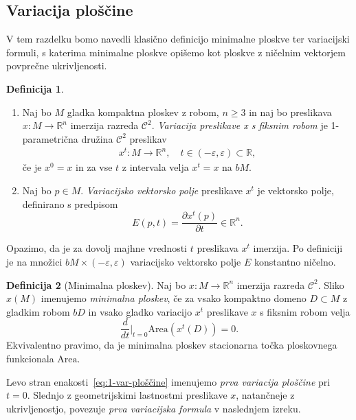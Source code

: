 \documentclass[12pt,a4paper,twoside]{article}
\theoremstyle{definition} %
\newtheorem{definicija}{Definicija}[section]
\theoremstyle{plain} %
\numberwithin{equation}{section}  %
\newcommand{\R}{\mathbb R}
\begin{document}
\subsection{Variacija ploščine}
V tem razdelku bomo navedli klasično definicijo minimalne ploskve ter variacijski formuli, s katerima minimalne ploskve opišemo kot ploskve z ničelnim vektorjem povprečne ukrivljenosti.
%
\begin{definicija}
\begin{enumerate}
\item
Naj bo $M$ gladka kompaktna ploskev z robom, $n \geq 3$ in naj bo preslikava $x \colon M \to \R^{n}$ imerzija razreda $\mathcal{C}^2$. \emph{Variacija preslikave x s fiksnim robom} je 1-parametrična družina $\mathcal{C}^2$ preslikav 
\begin{gather}
x^{t} \colon M \to \R^{n}, \quad t \in (-\varepsilon, \varepsilon) \subset \R,
\end{gather}
če je $x^0 = x$ in za vse $t$ z intervala velja $x^{t} = x$ na $bM$.
%
\item
Naj bo $p \in M$. \emph{Variacijsko vektorsko polje} preslikave $x^{t}$ je vektorsko polje, definirano s predpisom
\begin{equation}
E(p,t) = \frac{\partial{x^t(p)}}{\partial{t}} \in \R^{n}.
\end{equation}
\end{enumerate}
\end{definicija}

Opazimo, da je za dovolj majhne vrednosti $t$ preslikava $x^{t}$ imerzija.
Po definiciji je na množici $bM \times (-\varepsilon, \varepsilon)$ variacijsko vektorsko polje $E$ konstantno ničelno.

\begin{definicija} [Minimalna ploskev]
Naj bo $x \colon M \to \R^{n}$ imerzija razreda $\mathcal{C}^2$. Sliko $x(M)$ imenujemo \emph{minimalna ploskev}, če za vsako kompaktno domeno $D \subset M$ z gladkim robom $bD$ in vsako gladko variacijo $x^{t}$ preslikave $x$ s fiksnim robom velja
\begin{equation} \label{eq:1-var-ploščine}
\frac{d}{dt} \Big|_{t=0} \text{Area} \left(x^{t}(D)\right) = 0.
\end{equation}
Ekvivalentno pravimo, da je minimalna ploskev stacionarna točka ploskovnega funkcionala $\text{Area}$.
\end{definicija}

Levo stran enakosti~\eqref{eq:1-var-ploščine} imenujemo \emph{prva variacija ploščine} pri $t=0$. Slednjo z geometrijskimi lastnostmi preslikave $x$, natančneje z ukrivljenostjo, povezuje \emph{prva variacijska formula} v naslednjem izreku. 
\end{document}
